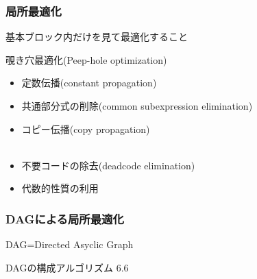 \documentclass[dvipdfmx]{beamer}
\begin{document}
\begin{frame}
 \frametitle{局所最適化}

 基本ブロック内だけを見て最適化すること

 覗き穴最適化(Peep-hole optimization)

 \begin{itemize}
  \item 定数伝播(constant propagation)\\
  \item 共通部分式の削除(common subexpression elimination)\\
  \item コピー伝播(copy propagation)\\
	\\
  \item 不要コードの除去(deadcode elimination)\\
  \item 代数的性質の利用\\
 \end{itemize}
\end{frame}

\begin{frame}
 \frametitle{DAGによる局所最適化}

 DAG=Directed Asyclic Graph\\


 DAGの構成アルゴリズム 6.6


\end{frame}
\end{document}
